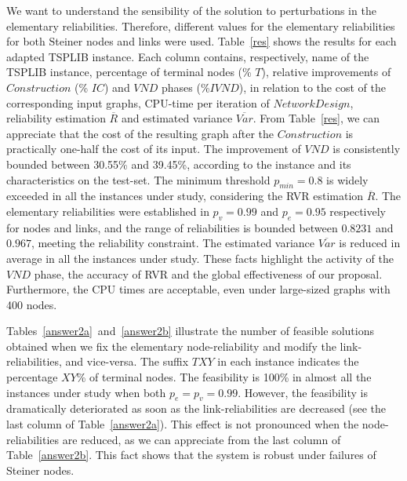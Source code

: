 \documentclass{llncs}
\begin{document}
We want to understand the sensibility of the solution to perturbations in the elementary reliabilities. 
Therefore, different values for the elementary reliabilities for both Steiner nodes and links were used. Table~\ref{res} shows the results for each adapted TSPLIB instance. Each column contains, respectively, name of the TSPLIB instance, percentage of terminal nodes (\% $T$), 
relative improvements of $Construction$  (\% $IC$) and $VND$ phases (\%$IVND$), in relation to the cost of the corresponding input graphs, CPU-time per iteration of $NetworkDesign$, 
reliability estimation $\overline{R}$ and estimated variance $\overline{Var}$. 
From Table~\ref{res}, we can appreciate that the cost of the resulting graph after the $Construction$ is practically one-half the cost of its input. The improvement of $VND$ is consistently bounded between 30.55\% and 39.45\%, according to the instance and its characteristics on the test-set. The minimum threshold $p_{min}=0.8$ is widely exceeded in all the instances under study, considering the RVR 
estimation $\overline{R}$. The elementary reliabilities were established in $p_v=0.99$ and $p_e=0.95$ respectively for nodes and links, and the range of reliabilities is bounded between $0.8231$ and $0.967$, meeting the reliability constraint. The estimated variance 
$\overline{Var}$ is reduced in average in all the instances under study. These facts highlight the activity of the $VND$ phase, the accuracy of RVR and the global effectiveness of our proposal. Furthermore, the CPU times are acceptable, even under large-sized graphs with 400 nodes.

Tables~\ref{answer2a}~and~\ref{answer2b} illustrate the number of feasible solutions 
obtained when we fix the elementary node-reliability and modify the link-reliabilities, and vice-versa. The suffix $TXY$ in each instance indicates the percentage $XY$\% of 
terminal nodes. The feasibility is 100\% in almost all the instances under study when 
both $p_e=p_v=0.99$. However, the feasibility is dramatically deteriorated as soon as 
the link-reliabilities are decreased (see the last column of Table~\ref{answer2a}). 
This effect is not pronounced when the node-reliabilities are reduced, as we can appreciate from the last column of Table~\ref{answer2b}. This fact shows that the system is robust under failures of Steiner nodes. 
\end{document}

